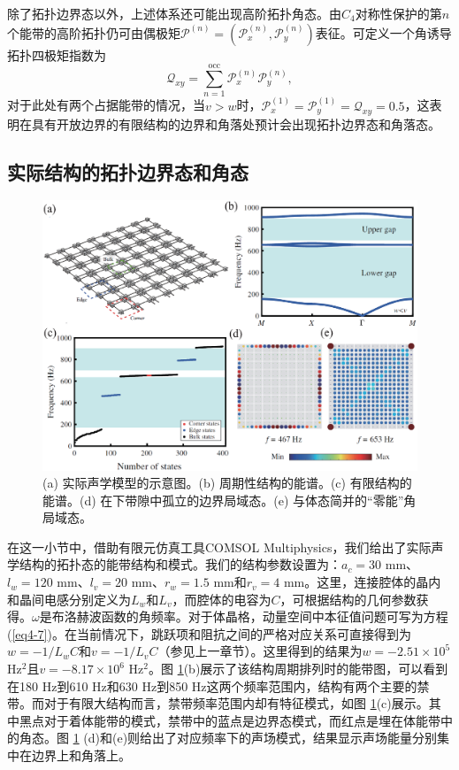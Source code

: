 除了拓扑边界态以外，上述体系还可能出现高阶拓扑角态。由$C_4$对称性保护的第$n$个能带的高阶拓扑仍可由偶极矩$\mathcal{P}^{(n)} = (\mathcal{P}_x^{(n)}, \mathcal{P}_y^{(n)})$表征。可定义一个角诱导拓扑四极矩指数为\cite{C45-3}
\begin{equation}
    \mathcal{Q}_{xy} = \sum_{n = 1}^{\text{occ}} \mathcal{P}_x^{(n)} \mathcal{P}_y^{(n)},
    \label{eq4-14}
\end{equation}
对于此处有两个占据能带的情况，当$v > w$时，$\mathcal{P}_x^{(1)} = \mathcal{P}_y^{(1)} = \mathcal{Q}_{xy} = 0.5$，这表明在具有开放边界的有限结构的边界和角落处预计会出现拓扑边界态和角落态。

\subsection{实际结构的拓扑边界态和角态}

\begin{figure}[h!]
    \centering
    \includegraphics[width=1\textwidth]{images/fig4-2.eps} 
    \caption{(a) 实际声学模型的示意图。(b) 周期性结构的能谱。(c) 有限结构的能谱。(d) 在下带隙中孤立的边界局域态。(e) 与体态简并的“零能”角局域态。}
    \label{fig_4_2}
  \end{figure}  

在这一小节中，借助有限元仿真工具COMSOL Multiphysics，我们给出了实际声学结构的拓扑态的能带结构和模式。我们的结构参数设置为：$a_c = 30$ mm、$l_w = 120$ mm、$l_v = 20$ mm、$r_w = 1.5$ mm和$r_v = 4$ mm。这里，连接腔体的晶内和晶间电感分别定义为$L_w$和$L_v$，而腔体的电容为$C$，可根据结构的几何参数获得。$\omega$是布洛赫波函数的角频率。对于体晶格，动量空间中本征值问题可写为方程(\ref{eq4-7})。在当前情况下，跳跃项和阻抗之间的严格对应关系可直接得到为$w = -1/L_wC$和$v = -1/L_vC$（参见上一章节）。这里得到的结果为$w = -2.51\times 10^5$ Hz$^2$且$v = -8.17\times 10^6$ Hz$^2$。图 \ref{fig_4_2}(b)展示了该结构周期排列时的能带图，可以看到在180 Hz到610 Hz和630 Hz到850 Hz这两个频率范围内，结构有两个主要的禁带。而对于有限大结构而言，禁带频率范围内却有特征模式，如图 \ref{fig_4_2}(c)展示。其中黑点对于着体能带的模式，禁带中的蓝点是边界态模式，而红点是埋在体能带中的角态。图 \ref{fig_4_2} (d)和(e)则给出了对应频率下的声场模式，结果显示声场能量分别集中在边界上和角落上。

